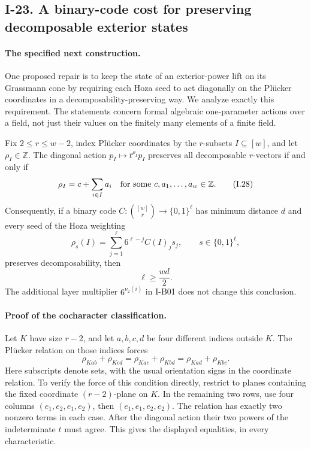 \subsection{I-23. A binary-code cost for preserving decomposable exterior states}
\label{I-23}

\paragraph{The specified next construction.}
One proposed repair is to keep the state of an exterior-power lift
on its Grassmann cone by requiring each Hoza seed to act diagonally
on the Pl\"ucker coordinates in a decomposability-preserving way.
We analyze exactly this requirement.  The statements concern
formal algebraic one-parameter actions over a field, not just
their values on the finitely many elements of a finite field.

Fix $2\le r\le w-2$, index Pl\"ucker coordinates by the
$r$-subsets $I\subseteq[w]$, and let $\rho_I\in\mathbb Z$.
The diagonal action $p_I\mapsto t^{\rho_I}p_I$ preserves all
decomposable $r$-vectors if and only if
\[
 \rho_I=c+\sum_{i\in I}a_i
 \quad\hbox{for some }c,a_1,\ldots,a_w\in\mathbb Z.
 \tag{I.28}\label{eq:I-plucker-additive}
\]
Consequently, if a binary code
$C:\binom{[w]}r\to\{0,1\}^{\ell}$ has minimum distance $d$
and every seed of the Hoza weighting
\[
 \rho_s(I)=\sum_{j=1}^{\ell}6^{\ell-j}C(I)_js_j,
 \qquad s\in\{0,1\}^{\ell},
\]
preserves decomposability, then
\[
 \ell\ge\frac{wd}{2}.
 \tag{I.29}\label{eq:I-plucker-code-cost}
\]
The additional layer multiplier $6^{\nu_2(i)}$ in I-B01
does not change this conclusion.

\paragraph{Proof of the cocharacter classification.}
Let $K$ have size $r-2$, and let $a,b,c,d$ be four different
indices outside $K$.  The Pl\"ucker relation on those indices
forces
\[
 \rho_{Kab}+\rho_{Kcd}
 =\rho_{Kac}+\rho_{Kbd}
 =\rho_{Kad}+\rho_{Kbc}.
\]
Here subscripts denote sets, with the usual orientation signs
in the coordinate relation.  To verify the force of this
condition directly, restrict to planes containing the fixed
coordinate $(r-2)$-plane on $K$.  In the remaining two rows,
use four columns $(e_1,e_2,e_1,e_2)$, then
$(e_1,e_1,e_2,e_2)$.  The relation has exactly two nonzero
terms in each case.  After the diagonal action their two powers
of the indeterminate $t$ must agree.  This gives the displayed
equalities, in every characteristic.

